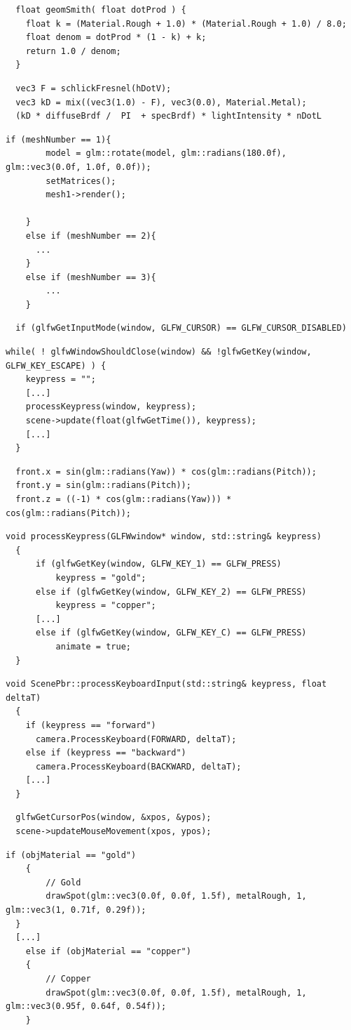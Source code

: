 \documentclass[
  11pt,
  a4paper,
  oneside
  ]{article}
\begin{document}
\begin{lstlisting}
  float geomSmith( float dotProd ) {
    float k = (Material.Rough + 1.0) * (Material.Rough + 1.0) / 8.0;
    float denom = dotProd * (1 - k) + k;
    return 1.0 / denom;
  }
\end{lstlisting}
\begin{lstlisting}
  vec3 F = schlickFresnel(hDotV);         
  vec3 kD = mix((vec3(1.0) - F), vec3(0.0), Material.Metal);
  (kD * diffuseBrdf /  PI  + specBrdf) * lightIntensity * nDotL
\end{lstlisting}
\begin{lstlisting}[tabsize=2]
  if (meshNumber == 1){
		model = glm::rotate(model, glm::radians(180.0f), glm::vec3(0.0f, 1.0f, 0.0f));
		setMatrices();
		mesh1->render();

	}
	else if (meshNumber == 2){
	  ...
	}
	else if (meshNumber == 3){
		...
	}
\end{lstlisting}
\begin{lstlisting}
  if (glfwGetInputMode(window, GLFW_CURSOR) == GLFW_CURSOR_DISABLED)
\end{lstlisting}
\begin{lstlisting}[tabsize=2]
  while( ! glfwWindowShouldClose(window) && !glfwGetKey(window, GLFW_KEY_ESCAPE) ) {
    keypress = "";
    [...]
    processKeypress(window, keypress);
    scene->update(float(glfwGetTime()), keypress);
    [...]
  }
\end{lstlisting}
\begin{lstlisting}
  front.x = sin(glm::radians(Yaw)) * cos(glm::radians(Pitch));
  front.y = sin(glm::radians(Pitch));
  front.z = ((-1) * cos(glm::radians(Yaw))) * cos(glm::radians(Pitch));
\end{lstlisting}
\begin{lstlisting}[tabsize=2]
  void processKeypress(GLFWwindow* window, std::string& keypress)
  {
      if (glfwGetKey(window, GLFW_KEY_1) == GLFW_PRESS)
          keypress = "gold";
      else if (glfwGetKey(window, GLFW_KEY_2) == GLFW_PRESS)
          keypress = "copper";
      [...]
      else if (glfwGetKey(window, GLFW_KEY_C) == GLFW_PRESS)
          animate = true;
  }
\end{lstlisting}
\begin{lstlisting}[tabsize=2]
  void ScenePbr::processKeyboardInput(std::string& keypress, float deltaT)
  {
    if (keypress == "forward")
      camera.ProcessKeyboard(FORWARD, deltaT);
    else if (keypress == "backward")
      camera.ProcessKeyboard(BACKWARD, deltaT);
    [...]
  }
\end{lstlisting}
\begin{lstlisting}
  glfwGetCursorPos(window, &xpos, &ypos);
  scene->updateMouseMovement(xpos, ypos);
\end{lstlisting}
\begin{lstlisting}[tabsize=2]
  if (objMaterial == "gold")
	{
		// Gold
		drawSpot(glm::vec3(0.0f, 0.0f, 1.5f), metalRough, 1, glm::vec3(1, 0.71f, 0.29f));
  }
  [...]  
	else if (objMaterial == "copper")
	{
		// Copper
		drawSpot(glm::vec3(0.0f, 0.0f, 1.5f), metalRough, 1, glm::vec3(0.95f, 0.64f, 0.54f));
	}
\end{lstlisting}
\end{document}
